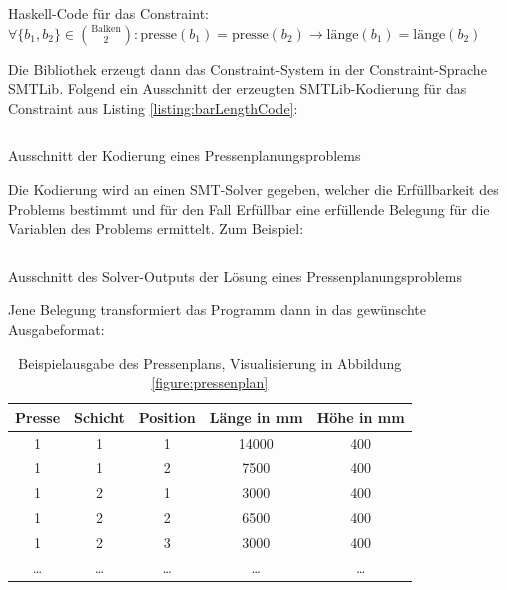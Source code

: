 \begin{listing}[H]
    \inputminted[linenos=true]{haskell}{Code/Einleitung/PressenlängeConstraintHaskell.hs}
    \caption{Haskell-Code für das Constraint: $ \forall \{b_1, b_2\} \in \binom{\text{Balken}}{2}: \text{presse}(b_1) = \text{presse}(b_2) \rightarrow \text{länge}(b_1) = \text{länge}(b_2) $}
    \label{listing:barLengthCode}
\end{listing}

Die Bibliothek erzeugt dann das Constraint-System in der Constraint-Sprache SMTLib.
Folgend ein Ausschnitt der erzeugten SMTLib-Kodierung für das Constraint aus Listing \ref{listing:barLengthCode}:

\begin{listing}[H]
    \inputminted[linenos=true]{bash}{Code/Einleitung/PressenlängeConstraintSMTLib.smt2}
    \caption{Ausschnitt der Kodierung eines Pressenplanungsproblems}
    \label{listing:barLengthSMTlib}
\end{listing}

Die Kodierung wird an einen SMT-Solver gegeben, welcher die Erfüllbarkeit des Problems bestimmt und für den Fall Erfüllbar eine erfüllende Belegung für die Variablen des Problems ermittelt.
Zum Beispiel:

\begin{listing}[H]
    \inputminted[linenos=true]{bash}{Code/Einleitung/PressenlängeConstraintSolverOutput.smt2}
    \caption{Ausschnitt des Solver-Outputs der Lösung eines Pressenplanungsproblems}
    \label{listing:barLengthSolverOutput}
\end{listing}

Jene Belegung transformiert das Programm dann in das gewünschte Ausgabeformat:

\begin{table}[H]
    \centering
    \begin{tabular}{|c|c|c|c|c|}
        \hline
        \textbf{Presse} & \textbf{Schicht} & \textbf{Position} & \textbf{Länge in mm} & \textbf{Höhe in mm} \\
        \hline
        1 & 1 & 1 & 14000 & 400 \\
        1 & 1 & 2 & 7500 & 400 \\
        1 & 2 & 1 & 3000 & 400 \\
        1 & 2 & 2 & 6500 & 400 \\
        1 & 2 & 3 & 3000 & 400 \\
        \ldots & \ldots & \ldots & \ldots & \ldots \\
        \hline
    \end{tabular}
    \caption{Beispielausgabe des Pressenplans, Visualisierung in Abbildung \ref{figure:pressenplan}}
    \label{table:pressenplan}
\end{table}

